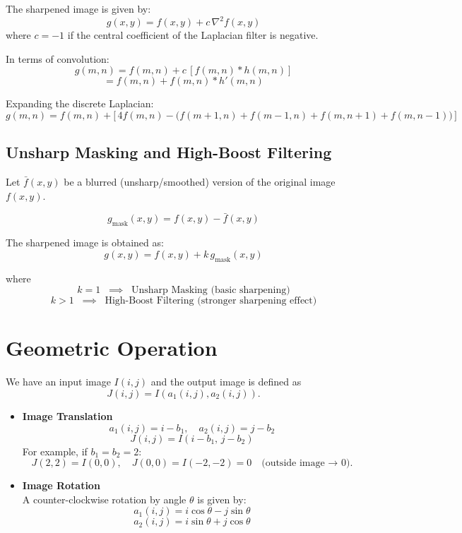 \documentclass[12 pt]{article}        	%
\begin{document}
The sharpened image is given by:
\[
g(x,y) = f(x,y) + c \, \nabla^2 f(x,y)
\]
where $c = -1$ if the central coefficient of the Laplacian filter is negative.

In terms of convolution:
\[
g(m,n) = f(m,n) + c \, [f(m,n) \ast h(m,n)]
\]
\[
= f(m,n) + f(m,n) \ast h'(m,n)
\]

Expanding the discrete Laplacian:
\[
g(m,n) = f(m,n) + \Big[\,4f(m,n) - \big(f(m+1,n) + f(m-1,n) + f(m,n+1) + f(m,n-1)\big)\,\Big]
\]

\subsection*{Unsharp Masking and High-Boost Filtering}

Let $\bar{f}(x,y)$ be a blurred (unsharp/smoothed) version of the original image $f(x,y)$.  

\[
g_{\text{mask}}(x,y) = f(x,y) - \bar{f}(x,y)
\]

The sharpened image is obtained as:  
\[
g(x,y) = f(x,y) + k \, g_{\text{mask}}(x,y)
\]

where  
\[
k = 1 \;\; \implies \;\; \text{Unsharp Masking (basic sharpening)}
\]  
\[
k > 1 \;\; \implies \;\; \text{High-Boost Filtering (stronger sharpening effect)}
\]

\section{Geometric Operation}

We have an input image $I(i,j)$ and the output image is defined as  
\[
J(i,j) = I(a_1(i,j), a_2(i,j)).
\]

\begin{itemize}
    \item \textbf{Image Translation}\\
    \[
    a_1(i,j) = i - b_1, \quad a_2(i,j) = j - b_2
    \]
    \[
    J(i,j) = I(i-b_1,\, j-b_2)
    \]
    For example, if $b_1 = b_2 = 2$:  
    \[
    J(2,2) = I(0,0), \quad J(0,0) = I(-2,-2) = 0 \quad \text{(outside image → 0)}.
    \]

    \item \textbf{Image Rotation}\\
    A counter-clockwise rotation by angle $\theta$ is given by:
    \[
    a_1(i,j) = i\cos\theta - j\sin\theta
    \]
    \[
    a_2(i,j) = i\sin\theta + j\cos\theta
    \]
\end{itemize}
\end{document}
